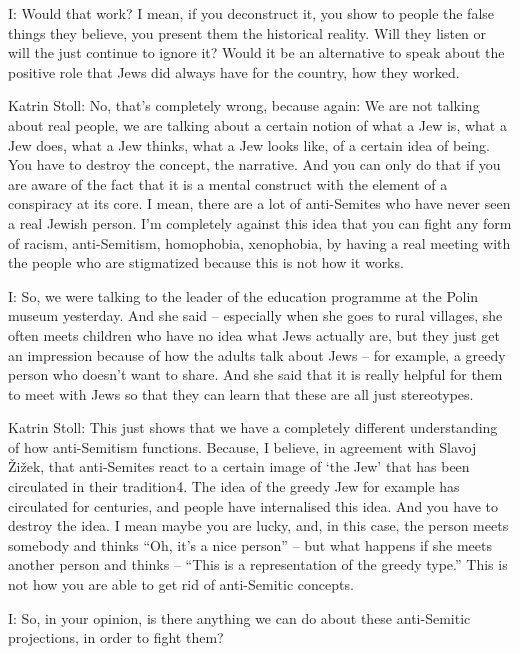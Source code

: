  

I: Would that work? I mean, if you deconstruct it, you show to people the false things they believe, you present them the historical reality. Will they listen or will the just continue to ignore it? Would it be an alternative to speak about the positive role that Jews did always have for the country, how they worked. 

 

Katrin Stoll: No, that’s completely wrong, because again:  We are not talking about real people, we are talking about a certain notion of what a Jew is, what a Jew does, what a Jew thinks, what a Jew looks like, of a certain idea of being.  You have to destroy the concept, the narrative. And you can only do that if you are aware of the fact that it is a mental construct with the element of a conspiracy at its core. I mean, there are a lot of anti-Semites who have never seen a real Jewish person. I’m completely against this idea that you can fight any form of racism, anti-Semitism, homophobia, xenophobia, by having a real meeting with the people who are stigmatized because this is not how it works. 

 

I: So, we were talking to the leader of the education programme at the Polin museum yesterday. And she said – especially when she goes to rural villages, she often meets children who have no idea what Jews actually are, but they just get an impression because of how the adults talk about Jews – for example, a greedy person who doesn’t want to share. And she said that it is really helpful for them to meet with Jews so that they can learn that these are all just stereotypes. 

 

Katrin Stoll: This just shows that we have a completely different understanding of how anti-Semitism functions. Because, I believe, in agreement with Slavoj Žižek, that anti-Semites react to a certain image of ‘the Jew’ that has been circulated in their tradition4. The idea of the greedy Jew for example has circulated for centuries, and people have internalised this idea. And you have to destroy the idea. I mean maybe you are lucky, and, in this case, the person meets somebody and thinks “Oh, it’s a nice person” – but what happens if she meets another person and thinks – “This is a representation of the greedy type.” This is not how you are able to get rid of anti-Semitic concepts. 

 

I: So, in your opinion, is there anything we can do about these anti-Semitic projections, in order to fight them? 

